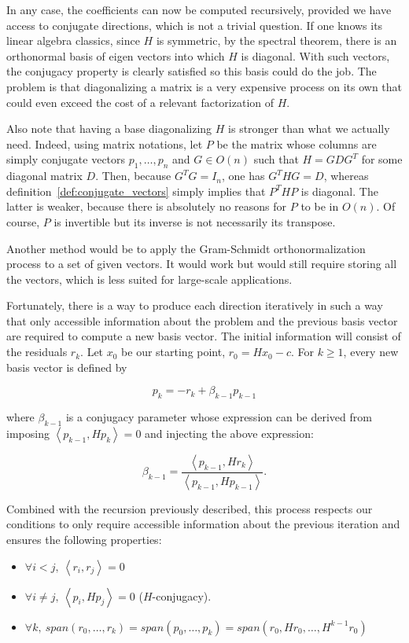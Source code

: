 \documentclass[10pt]{article}
\numberwithin{equation}{section}
\newcommand{\scal}[2]{\left\langle {#1} , {#2} \right\rangle} %
\begin{document}
	In any case, the coefficients can now be computed recursively, provided we have access to conjugate directions, which is not a trivial question. If one knows its linear algebra classics, since $H$ is symmetric, by the spectral theorem, there is an orthonormal basis of eigen vectors into which $H$ is diagonal. With such vectors, the conjugacy property is clearly satisfied so this basis could do the job. The problem is that diagonalizing a matrix is a very expensive process on its own that could even exceed the cost of a relevant factorization of $H$. 
	
	Also note that having a base diagonalizing $H$ is stronger than what we actually need. Indeed, using matrix notations, let $P$ be the matrix whose columns are simply conjugate vectors $p_1,\ldots,p_n$ and $G \in O(n)$ such that $H=GDG^T$ for some diagonal matrix $D$. Then, because $G^TG=I_n$, one has $G^THG=D$, whereas definition~\ref{def:conjugate_vectors} simply implies that $P^THP$ is diagonal. The latter is weaker, because there is absolutely no reasons for $P$ to be in $O(n)$. Of course, $P$ is invertible but its inverse is not necessarily its transpose. 
	
	Another method would be to apply the Gram-Schmidt orthonormalization process to a set of given vectors. It would work but would still require storing all the vectors, which is less suited for large-scale applications. 
	
	Fortunately, there is a way to produce each direction iteratively in such a way that only accessible information about the problem and the previous basis vector are required to compute a new basis vector. The initial information will consist of the residuals $r_k$. Let $x_0$ be our starting point, $r_0=Hx_0-c$. For $k\ge 1$, every new basis vector is defined by
	
	\[p_k = -r_k + \beta_{k-1} p_{k-1}\]
	
	where $\beta_{k-1}$ is a conjugacy parameter whose expression can be derived from imposing $\scal{p_{k-1}}{Hp_k}=0$ and injecting the above expression:
	
	\[ \beta_{k-1} = \dfrac{\scal{p_{k-1}}{Hr_k}}{\scal{p_{k-1}}{Hp_{k-1}}}.\]
	
	Combined with the recursion previously described, this process respects our conditions to only require accessible information about the previous iteration and ensures the following properties:
	\begin{itemize}
		\item $\forall i<j,\ \scal{r_i}{r_j}=0$
		\item $\forall i\neq j,\ \scal{p_i}{Hp_j}=0$ ($H$-conjugacy).
		\item $\forall k,\ span(r_0,\ldots,r_k) = span(p_0,\ldots,p_k) = span(r_0,Hr_0,\ldots,H^{k-1}r_0)$
	\end{itemize}
	
\end{document}
